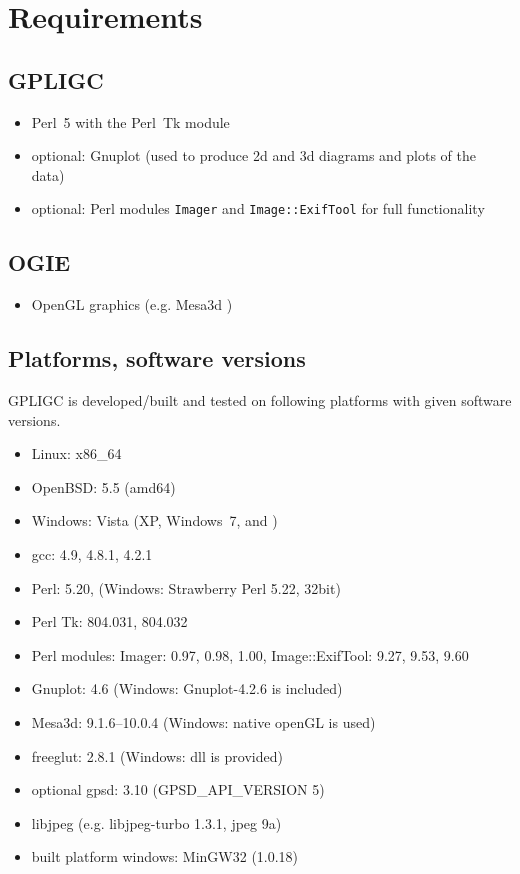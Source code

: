 \section{Requirements}
\label{requirements}

\subsection*{GPLIGC}

\begin{itemize}
\item Perl~5 with the Perl~Tk module \cite{perl,perltk}
\item {\scriptsize optional:} Gnuplot \cite{gnuplot} (used to produce 2d and 3d diagrams and plots of the data)
\item {\scriptsize optional:} Perl modules \texttt{Imager} \cite{imager} and \texttt{Image::ExifTool} \cite{exiftool} for full functionality
\end{itemize}


\subsection*{OGIE}

\begin{itemize}
\item OpenGL graphics (e.g. Mesa3d \cite{mesa})
\end{itemize}


\subsection*{Platforms, software versions}
GPLIGC is developed/built and tested on following platforms with given software versions.

\begin{itemize}
\item Linux: x86\_64
\item OpenBSD: 5.5 (amd64)
\item Windows: Vista (XP, Windows~7, and )
\item gcc: 4.9, %
4.8.1, %
4.2.1 %
\item Perl: 5.20, %
(Windows: Strawberry Perl 5.22, 32bit)
\item Perl Tk: 804.031, 804.032
\item Perl modules: Imager: 0.97, 0.98, 1.00, %
Image::ExifTool: 9.27, 9.53, 9.60
\item Gnuplot: 4.6 (Windows: Gnuplot-4.2.6 is included)
\item Mesa3d: 9.1.6--10.0.4 (Windows: native openGL is used)
\item freeglut: 2.8.1 (Windows: dll is provided)
\item {\scriptsize optional} gpsd: 3.10 (GPSD\_API\_VERSION 5)
\item libjpeg (e.g. libjpeg-turbo 1.3.1, jpeg 9a)
\item built platform windows: MinGW32 (1.0.18)
\end{itemize}



